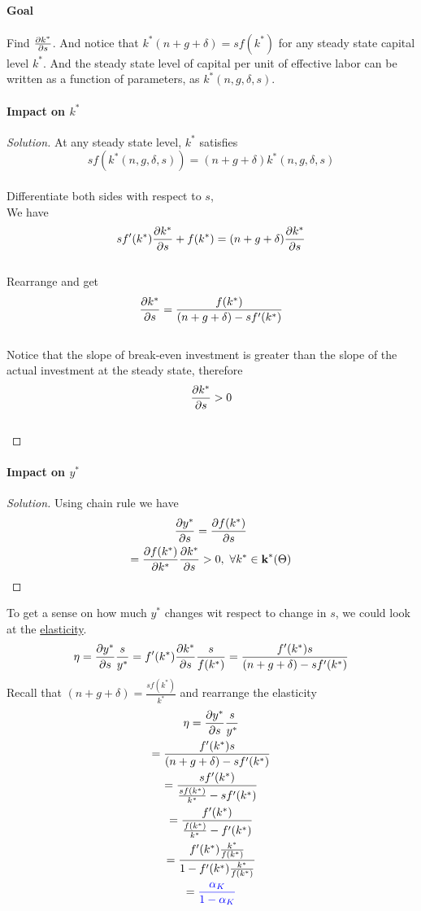 \documentclass[]{article}
\begin{document}
				\paragraph{Goal} Find $\frac{\partial{k^*}}{\partial{s}}$. And notice that $k^*(n+g+\delta) = sf(k^*)$ for any steady state capital level $k^*$. And the steady state level of capital per unit of effective labor can be written as a function of parameters, as $k^*(n, g, \delta, s)$.
				
			\paragraph{Impact on $k^*$}
			\begin{proof}[Solution]
				At any steady state level, $k^*$ satisfies \\
				\[sf(k^*(n,g,\delta,s)) = (n+g+\delta)k^*(n,g,\delta,s)\] \\
				Differentiate both sides with respect to $s$, \\
				We have \[sf'(k^*)\frac{\partial{k^*}}{\partial{s}} + f(k^*) = (n+g+\delta)\frac{\partial{k^*}}{\partial{s}}\] \\
				Rearrange and get \\
				\[
					\frac{\partial{k^*}}{\partial{s}} = \frac{f(k^*)}{(n+g+\delta) - sf'(k^*)}
				\] \\
				Notice that the slope of break-even investment is greater than the slope of the actual investment at the steady state, therefore \[\frac{\partial{k^*}}{\partial{s}} > 0\] \\
			\end{proof}
			
			\paragraph{Impact on $y^*$}
			\begin{proof}[Solution]
				Using chain rule we have
				\begin{gather*}
					\frac{\partial{y^*}}{\partial{s}} = \frac{\partial{f(k^*)}}{\partial{s}} \\
					= \frac{\partial{f(k^*)}}{\partial{k^*}} \frac{\partial{k^*}}{\partial{s}} > 0,\ \forall k^* \in \textbf{k}^*({\Theta})
				\end{gather*}
			\end{proof}
			
			\par To get a sense on how much $y^*$ changes wit respect to change in $s$, we could look at the \ul{elasticity}.
			\[
				\eta = \frac{\partial{y^*}}{\partial{s}}\frac{s}{y^*} = f'(k^*) \frac{\partial{k^*}}{\partial{s}} \frac{s}{f(k^*)} = \frac{f'(k^*)s}{(n+g+\delta) - sf'(k^*)}
			\]
			Recall that $(n+g+\delta) = \frac{sf(k^*)}{k^*}$ and rearrange the elasticity
			\begin{gather*}
				\eta = \frac{\partial{y^*}}{\partial{s}}\frac{s}{y^*} \\
				= \frac{f'(k^*)s}{(n+g+\delta) - sf'(k^*)} \\
				= \frac{s f'(k^*)}{\frac{s f(k^*)}{k^*} - sf'(k^*)} \\
				= \frac{f'(k^*)}{\frac{f(k^*)}{k^*} - f'(k^*)} \\
				= \frac{f'(k^*) \frac{k^*}{f(k^*)}}{1 - f'(k^*)\frac{k^*}{f(k^*)}} \\
				= \textcolor{blue}{
					\frac{\alpha_K}{1 - \alpha_K}
					} \\
			\end{gather*}
			
\end{document}

